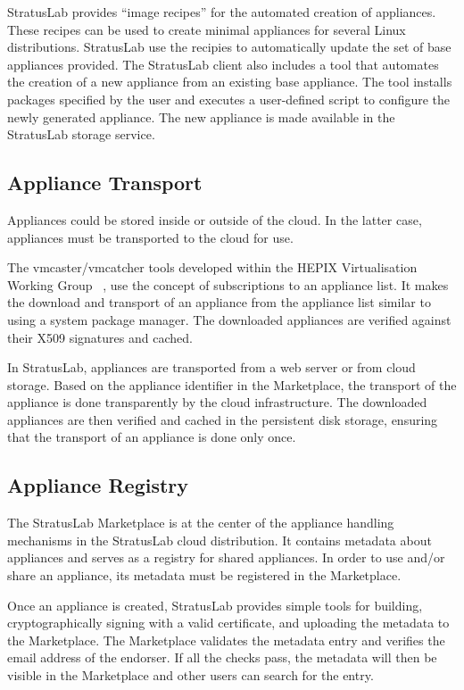 StratusLab provides ``image recipes'' for the automated creation of appliances. 
These recipes can be used to create minimal appliances for several
Linux distributions. StratusLab use the recipies to automatically update 
the set of base appliances provided. The StratusLab client also includes a tool that  
automates the creation of a new appliance from an existing base appliance.
The tool installs packages specified by the user and executes a user-defined  
script to configure the newly generated appliance. The new appliance is made available 
in the StratusLab storage service.

\subsection{Appliance Transport}

Appliances could be stored inside or outside of the cloud. In the latter case, 
appliances must be transported to the cloud for use.

The vmcaster/vmcatcher tools developed within the HEPIX Virtualisation Working
Group ~\cite{hepixbooktransfer}, use the concept of subscriptions to an 
appliance list. It makes the download and transport of an appliance 
from the appliance list similar to using a system package manager.
The downloaded appliances are
verified against their X509 signatures and cached.

In StratusLab, appliances are transported from a web
server or from cloud storage. Based on the appliance identifier in the Marketplace,
the transport of the appliance is done transparently by the cloud infrastructure.
The downloaded appliances are then verified and cached in the persistent disk storage,
ensuring that the transport of an appliance is done only once.

\subsection{Appliance Registry}

The StratusLab Marketplace is at the center of the appliance handling
mechanisms in the StratusLab cloud distribution. It contains metadata 
about appliances and serves as a registry for shared appliances. 
In order to use and/or share an appliance, its metadata must be registered 
in the Marketplace\@. 

Once an appliance is created, StratusLab provides simple tools for 
building, cryptographically signing with a valid
certificate, and uploading the metadata to the Marketplace\@.  The Marketplace
validates the metadata entry and verifies the 
email address of the endorser.  If all the checks pass, 
the metadata will then be visible in the Marketplace and other users 
can search for the entry.
